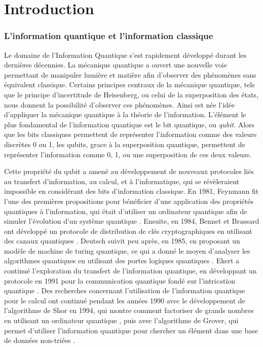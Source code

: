 \chapter*{Introduction}
\label{introduction_fr} 


\subsection*{L'information quantique et l'information classique}



Le domaine de l'Information Quantique s'est rapidement d\'evelopp\'e durant les derni\`eres d\'ecennies. La m\'ecanique quantique a ouvert une nouvelle voie permettant de manipuler lumi\`ere et mati\`ere afin d'observer des ph\'enom\`enes sans \'equivalent classique. Certains principes centraux de la m\'ecanique quantique, tels que le principe d'incertitude de Heisenberg, ou celui de la superposition des \'etats, nous donnent la possibilit\'e d'observer ces ph\'enom\`enes. Ainsi est n\'ee l'id\'ee d'appliquer la m\'ecanique quantique \`a la th\'eorie de l'information. L'\'el\'ement le plus fondamental de l'information quantique est le bit quantique, ou \emph{qubit}. Alors que les bits classiques permettent de repr\'esenter l'information comme des valeurs discr\`etes 0 ou 1, les qubits, grace \`a la superposition quantique, permettent de repr\'esenter l'information comme 0, 1, ou une superposition de ces deux valeurs.

 
Cette propri\'et\'e du qubit a amen\'e au d\'eveloppement de nouveaux protocoles li\'es au transfert d'information, au calcul, et \`a l'informatique, qui se r\'ev\`eleraient impossible en consid\'erant des bits d'information classique. En 1981, Feynmann fit l'une des premi\`eres propositions pour b\'en\'eficier d'une application des propri\'et\'es quantiques \`a l'information, qui \'etait d'utiliser un ordinateur quantique afin de simuler l'\'evolution d'un syst\`eme quantique  \cite{feynman1982simulating}. Ensuite, en 1984, Bennet et Brassard ont d\'evelopp\'e un protocole de distribution de cl\'es cryptographiques en utilisant des canaux quantiques \cite{Bennett84}. Deutsch suivit peu apr\`es, en 1985, en proposant un mod\`ele de machine de turing quantique, ce qui a donn\'e le moyen d'analyser les algorithmes quantiques en utilisant des portes logiques quantiques \cite{Deutsch85}. Ekert a continu\'e l'exploration du transfert de l'information quantique, en d\'eveloppant un protocole en 1991 pour la communication quantique fond\'e sur l'intrication quantique \cite{Ekert91}. Des recherches concernant l'utilisation de l'information quantique pour le calcul ont continu\'e pendant les ann\'ees 1990 avec le d\'eveloppement de l'algorithme de Shor en 1994, qui montre comment factoriser de grands nombres en utilisant un ordinateur quantique \cite{Shor94}, puis avec l'algorithme de Grover, qui permet d'utiliser l'information quantique pour chercher un \'el\'ement dans une base de donn\'ees non-tri\'ees \cite{Grover96}.

